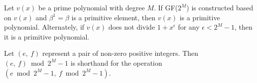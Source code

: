 \begin{definition}
Let $v(x)$ be a prime polynomial with degree $M$. If GF($2^M$) is constructed based on $v(x)$ and $\beta^1 = \beta$ is a primitive element, then $v(x)$ is a primitive polynomial. Alternately, if $v(x)$ does not divide $1+x^{\epsilon}$ for any $\epsilon<2^M-1$, then it is a primitive polynomial. 
\end{definition}

\begin{definition}
Let $(e,~f)$ represent a pair of non-zero positive integers. Then $(e,~f) \bmod 2^M-1$ is shorthand for the operation $(e \bmod 2^M-1,~f \bmod 2^M-1)$.
\end{definition}








